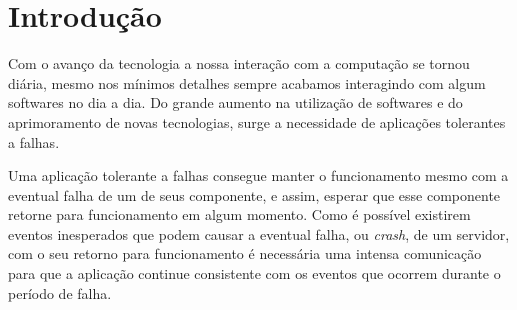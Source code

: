 \documentclass[12pt,
openright, 
oneside,
a4paper,
brazil]{facom-ufu-abntex2}
\begin{document}
\imprimircapa
\imprimirfolhaderosto








\tableofcontents*
\cleardoublepage


\textual

\chapter{Introdução}

Com o avanço da tecnologia a nossa interação com a computação se tornou diária, mesmo
nos mínimos detalhes sempre acabamos interagindo com algum softwares no dia a dia. Do
grande aumento na utilização de softwares e do aprimoramento de novas tecnologias, surge
a necessidade de aplicações tolerantes a falhas. 

Uma aplicação tolerante a falhas consegue manter o funcionamento mesmo com a eventual 
falha de um de seus componente, e assim, esperar que esse componente retorne para 
funcionamento em algum momento. Como é possível existirem eventos inesperados que podem
causar a eventual falha, ou \textit{crash}, de um servidor, com o seu retorno para 
funcionamento é necessária uma intensa comunicação para que a aplicação continue
consistente com os eventos que ocorrem durante o período de falha.
\end{document}

